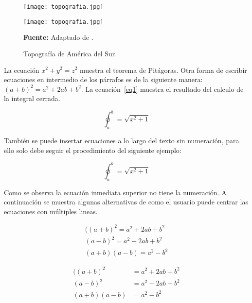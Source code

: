 \begin{figure}[htbp]
\centering
\texttt{[image: topografia.jpg]}
\label{fig02}
\end{figure}


\begin{figure}[!ht]
\centering
\texttt{[image: topografia.jpg]}
\vspace{-1.0cm}
\caption{Topografía de América del Sur.}
\centering \textbf{Fuente:} Adaptado de \cite{solman2013}.
\label{fig03}
\end{figure}

La ecuación \(x^2 + y^2 = z^2\) muestra el teorema de Pitágoras. Otra forma de escribir ecuaciones en intermedio de los párrafos es de la siguiente manera: $(a+b)^2 = a^2 + 2ab + b^2$. La ecuación~\ref{eq1} muestra el resultado del calculo de la integral cerrada. 

\begin{equation}
\oint_{a}^{b} = \sqrt{x^2+1}
\label{eq1}
\end{equation}

También se puede insertar ecuaciones a lo largo del texto sin numeración, para ello solo debe seguir el procedimiento del siguiente ejemplo:\newline

\begin{equation*}
\oint_{a}^{b} = \sqrt{x^2+1}
\label{eq2}
\end{equation*}

Como se observa la ecuación inmediata superior no tiene la numeración. A continuación se muestra algunas alternativas de como el usuario puede centrar las ecuaciones con múltiples lineas. 

\begin{gather}
((a+b)^2 = a^2 + 2ab + b^2\\
(a-b)^2 = a^2 - 2ab + b^2\\
(a+b)(a-b) = a^2 - b^2
\end{gather}

\begin{align}
((a+b)^2& = a^2 + 2ab + b^2\\
(a-b)^2& = a^2 - 2ab + b^2\\
(a+b)(a-b)& = a^2 - b^2
\end{align}


